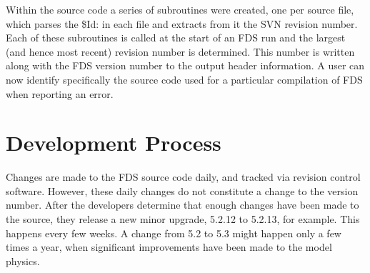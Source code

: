 \documentclass[11pt]{book}
\begin{document}
Within the source code a series of subroutines were created, one per source file, which parses the {\ct \$Id:} in
each file and extracts from it the SVN revision number.  Each of these subroutines is called at the start
of an FDS run and the largest (and hence most recent) revision number is determined.  This number is written
along with the FDS version number to the output header information.  A user can now identify specifically
the source code used for a particular compilation of FDS when reporting an error.




\clearpage
\section{Development Process}

Changes are made to the FDS source code daily, and tracked via revision control software. However, these daily changes do not constitute a change to
the version number. After the developers determine that enough changes have been made to the source, they release a new minor upgrade, 5.2.12 to
5.2.13, for example. This happens every few weeks. A change from 5.2 to 5.3 might happen only a few times a year, when significant improvements have
been made to the model physics.
\end{document}
